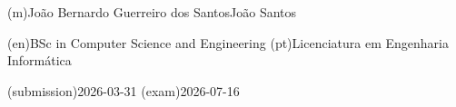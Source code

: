 %
%
\ntauthorname(m){João Bernardo Guerreiro dos Santos}{João Santos}



%
%
%
\ntauthordegree(en){BSc in Computer Science and Engineering}%
\ntauthordegree(pt){Licenciatura em Engenharia Informática}%



%
%
%

%
%
\ntdate(submission){2026-03-31}
\ntdate(exam){2026-07-16}



